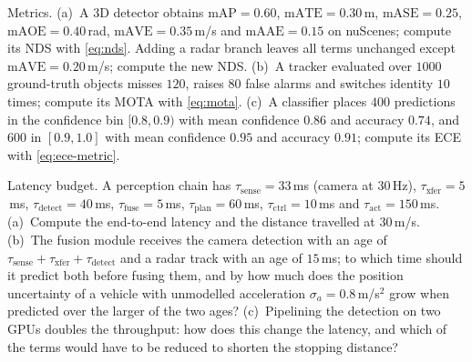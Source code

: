\begin{prob}\label{prob:ch05:7}
Metrics. (a)~A 3D detector obtains $\mathrm{mAP}=0.60$, $\mathrm{mATE}=0.30$\,m, $\mathrm{mASE}=0.25$, $\mathrm{mAOE}=0.40$\,rad, $\mathrm{mAVE}=0.35$\,m/s and $\mathrm{mAAE}=0.15$ on nuScenes; compute its NDS with \eqref{eq:nds}. Adding a radar branch leaves all terms unchanged except $\mathrm{mAVE}=0.20$\,m/s; compute the new NDS. (b)~A tracker evaluated over $1000$ ground-truth objects misses $120$, raises $80$ false alarms and switches identity $10$ times; compute its MOTA with \eqref{eq:mota}. (c)~A classifier places $400$ predictions in the confidence bin $[0.8,0.9)$ with mean confidence $0.86$ and accuracy $0.74$, and $600$ in $[0.9,1.0]$ with mean confidence $0.95$ and accuracy $0.91$; compute its ECE with \eqref{eq:ece-metric}.
\end{prob}

\begin{prob}\label{prob:ch05:8}
Latency budget. A perception chain has $\tau_{\mathrm{sense}}=33$\,ms (camera at $30$\,Hz), $\tau_{\mathrm{xfer}}=5$\,ms, $\tau_{\mathrm{detect}}=40$\,ms, $\tau_{\mathrm{fuse}}=5$\,ms, $\tau_{\mathrm{plan}}=60$\,ms, $\tau_{\mathrm{ctrl}}=10$\,ms and $\tau_{\mathrm{act}}=150$\,ms. (a)~Compute the end-to-end latency and the distance travelled at $30$\,m/s. (b)~The fusion module receives the camera detection with an age of $\tau_{\mathrm{sense}}+\tau_{\mathrm{xfer}}+\tau_{\mathrm{detect}}$ and a radar track with an age of $15$\,ms; to which time should it predict both before fusing them, and by how much does the position uncertainty of a vehicle with unmodelled acceleration $\sigma_{a}=0.8$\,m/s$^{2}$ grow when predicted over the larger of the two ages? (c)~Pipelining the detection on two GPUs doubles the throughput: how does this change the latency, and which of the terms would have to be reduced to shorten the stopping distance?
\end{prob}

